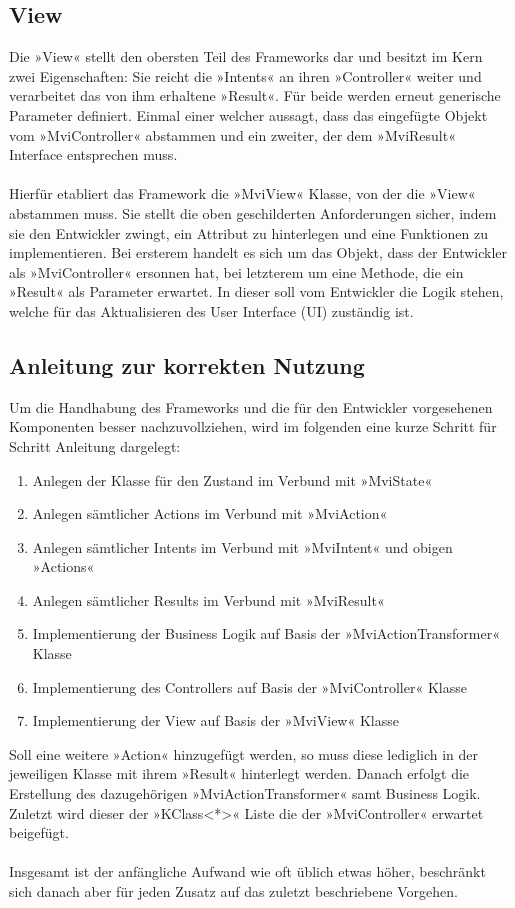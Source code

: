 \subsection{View}
Die »View« stellt den obersten Teil des Frameworks dar und besitzt im Kern zwei Eigenschaften: Sie reicht die »Intents« an ihren »Controller« weiter und verarbeitet das von ihm erhaltene »Result«. Für beide werden erneut generische Parameter definiert. Einmal einer welcher aussagt, dass das eingefügte Objekt vom »MviController« abstammen und ein zweiter, der dem »MviResult« Interface entsprechen muss.
\\\\
Hierfür etabliert das Framework die »MviView« Klasse, von der die »View« abstammen muss. Sie stellt die oben geschilderten Anforderungen sicher, indem sie den Entwickler zwingt, ein Attribut zu hinterlegen und eine Funktionen zu implementieren. Bei ersterem handelt es sich um das Objekt, dass der Entwickler als »MviController« ersonnen hat, bei letzterem um eine Methode, die ein »Result« als Parameter erwartet. In dieser soll vom Entwickler die Logik stehen, welche für das Aktualisieren des User Interface (UI) zuständig ist. 

\subsection{Anleitung zur korrekten Nutzung}
Um die Handhabung des Frameworks und die für den Entwickler vorgesehenen Komponenten besser nachzuvollziehen, wird im folgenden eine kurze Schritt für Schritt Anleitung dargelegt:
\begin{enumerate}
	\item Anlegen der Klasse für den Zustand im Verbund mit »MviState«
	\item Anlegen sämtlicher Actions im Verbund mit »MviAction«
	\item Anlegen sämtlicher Intents im Verbund mit »MviIntent« und obigen »Actions«
	\item Anlegen sämtlicher Results im Verbund mit »MviResult«
	\item Implementierung der Business Logik auf Basis der »MviActionTransformer« Klasse
	\item Implementierung des Controllers auf Basis der »MviController« Klasse
	\item Implementierung der View auf Basis der »MviView« Klasse
\end{enumerate}
\bigskip
Soll eine weitere »Action« hinzugefügt werden, so muss diese lediglich in der jeweiligen Klasse mit ihrem »Result« hinterlegt werden. Danach erfolgt die Erstellung des dazugehörigen »MviActionTransformer« samt Business Logik. Zuletzt wird dieser der »KClass<*>« Liste die der »MviController« erwartet beigefügt.
\\\\
Insgesamt ist der anfängliche Aufwand wie oft üblich etwas höher, beschränkt sich danach aber für jeden Zusatz auf das zuletzt beschriebene Vorgehen.